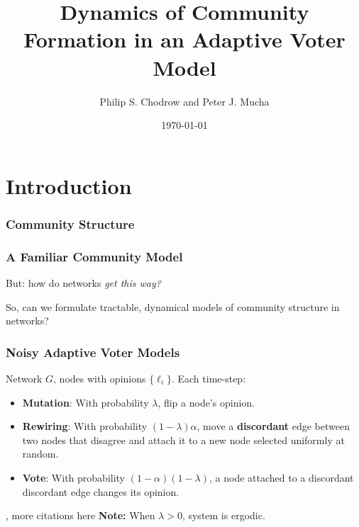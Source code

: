 \documentclass{beamer}
\title{Dynamics of Community Formation in an Adaptive Voter Model}
\date{\today}
\author{Philip S. Chodrow and Peter J. Mucha}
\institute{
	\vspace{6.4mm}
	$\vcenter{\hbox{\texttt{[image: mit\_logo]}}}$
	\hspace*{.2in}
	$\vcenter{\hbox{\texttt{[image: nsf\_logo]}}}$
}
\begin{document}
\maketitle

\section{Introduction}
		
		\begin{frame}\frametitle{Community Structure}
		  
		\end{frame}

		
		\begin{frame}\frametitle{A Familiar Community Model}
		  
			But: how do networks \emph{get this way?} 
		\end{frame}
	
		
		\begin{frame}[standout]
			So, can we formulate \alert{tractable}, \alert{dynamical} models of community structure in networks?
		\end{frame}
	
		
		\begin{frame}\frametitle{Noisy Adaptive Voter Models}
		  	Network $G$, nodes with opinions $\{\ell_i\}$. Each time-step:
		  	\begin{itemize}
		  		\item \textbf{Mutation}: With probability $\lambda$, flip a node's opinion.
		  		\item \textbf{Rewiring}: With probability $(1-\lambda)\alpha$, move a \textbf{discordant} edge between two nodes that disagree and attach it to a new node selected uniformly at random. 
		  		\item \textbf{Vote}: With probability $(1-\alpha)(1-\lambda)$, a node attached to a discordant discordant edge changes its opinion. 
		  	\end{itemize}
		  	\cite{Durrett2012}, more citations here
		  	\textbf{Note:} When $\lambda > 0$, system is ergodic. 
		\end{frame}
\end{document}
